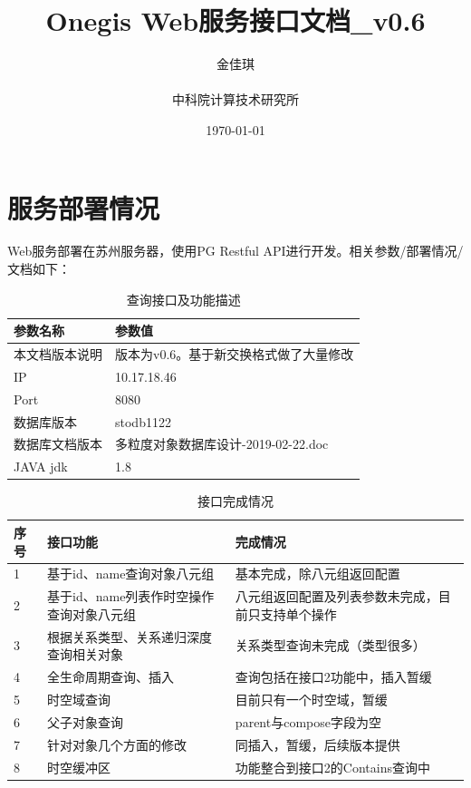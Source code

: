 \documentclass[UTF8, 12pt]{ctexart}
\author{金佳琪\\
\\
\large 中科院计算技术研究所}
\title{Onegis Web服务接口文档\_v0.6}
\date{\today}
\begin{document}
\maketitle\thispagestyle{fancy}
\tableofcontents\thispagestyle{fancy}

\section{服务部署情况}
	Web服务部署在苏州服务器，使用PG Restful API进行开发。相关参数/部署情况/文档如下：
	\begin{table}[H]
		\centering
		\caption{查询接口及功能描述}
		\begin{tabular}{|p{6cm}|p{8cm}|}
			\hline
			参数名称 & 参数值 \\
			\hline
			本文档版本说明 & 版本为v0.6。基于新交换格式做了大量修改 \\
			\hline
			IP & 10.17.18.46 \\
			\hline
			Port & 8080 \\
			\hline
			数据库版本 & stodb1122 \\
			\hline
			数据库文档版本 & 多粒度对象数据库设计-2019-02-22.doc \\
			\hline
			JAVA jdk & 1.8 \\
			\hline
		\end{tabular}
	\end{table}

	\begin{table}[H]
		\centering
		\caption{接口完成情况}
		\begin{tabular}{|p{1cm}|p{6cm}|p{8cm}|}
			\hline
			序号 & 接口功能 & 完成情况 \\
			\hline
			1 & 基于id、name查询对象八元组 & 基本完成，除八元组返回配置 \\
			\hline
			2 & 基于id、name列表作时空操作查询对象八元组 & 八元组返回配置及列表参数未完成，目前只支持单个操作 \\
			\hline
			3 & 根据关系类型、关系递归深度查询相关对象 & 关系类型查询未完成（类型很多） \\
			\hline
			4 & 全生命周期查询、插入 & 查询包括在接口2功能中，插入暂缓 \\
			\hline
			5 & 时空域查询 & 目前只有一个时空域，暂缓 \\
			\hline
			6 & 父子对象查询 & parent与compose字段为空 \\
			\hline
			7 & 针对对象几个方面的修改 & 同插入，暂缓，后续版本提供 \\
			\hline
			8 & 时空缓冲区 & 功能整合到接口2的Contains查询中 \\
			\hline
		\end{tabular}
	\end{table}
	
\end{document}
